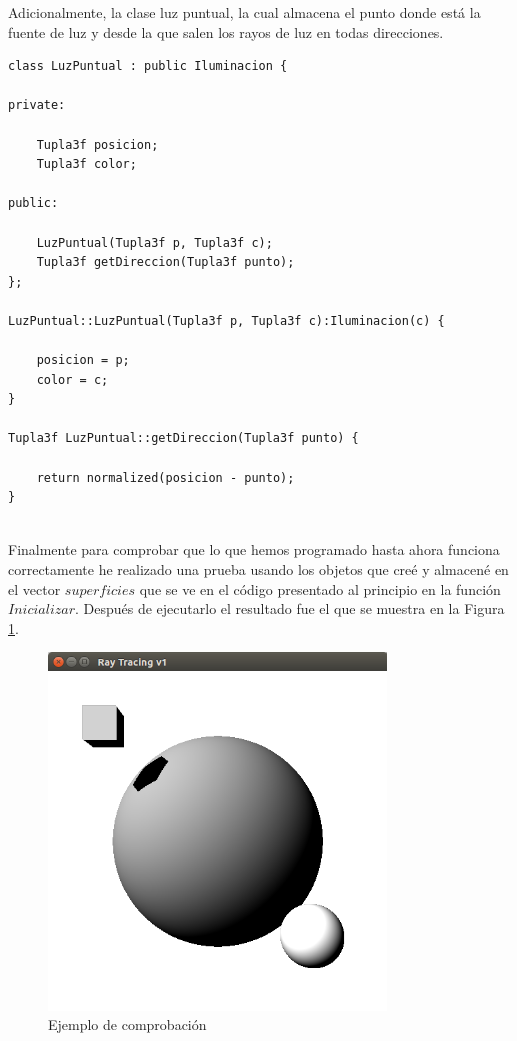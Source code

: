 Adicionalmente, la clase luz puntual, la cual almacena el punto donde está la fuente de luz y desde la que salen los rayos de luz en todas direcciones.

\begin{lstlisting}[style=Consola]
class LuzPuntual : public Iluminacion {

private:

	Tupla3f posicion;
	Tupla3f color;

public:

	LuzPuntual(Tupla3f p, Tupla3f c);
	Tupla3f getDireccion(Tupla3f punto);
};

LuzPuntual::LuzPuntual(Tupla3f p, Tupla3f c):Iluminacion(c) {

	posicion = p;
	color = c;
}

Tupla3f LuzPuntual::getDireccion(Tupla3f punto) {

	return normalized(posicion - punto);
}
\end{lstlisting}
${ }$\\


Finalmente para comprobar que lo que hemos programado hasta ahora funciona correctamente he realizado una prueba usando los objetos que creé y almacené en el vector $superficies$ que se ve en el código presentado al principio en la función $Inicializar$. Después de ejecutarlo el resultado fue el que se muestra en la Figura \ref{fig:etiq_9}.
${ }$\\

\begin{figure}[h]
	\begin{center}
		\includegraphics[width=0.8\textwidth]{imagenes/prueba.png}
	\end{center}
	\caption{Ejemplo de comprobación}
	\label{fig:etiq_9}
\end{figure}

